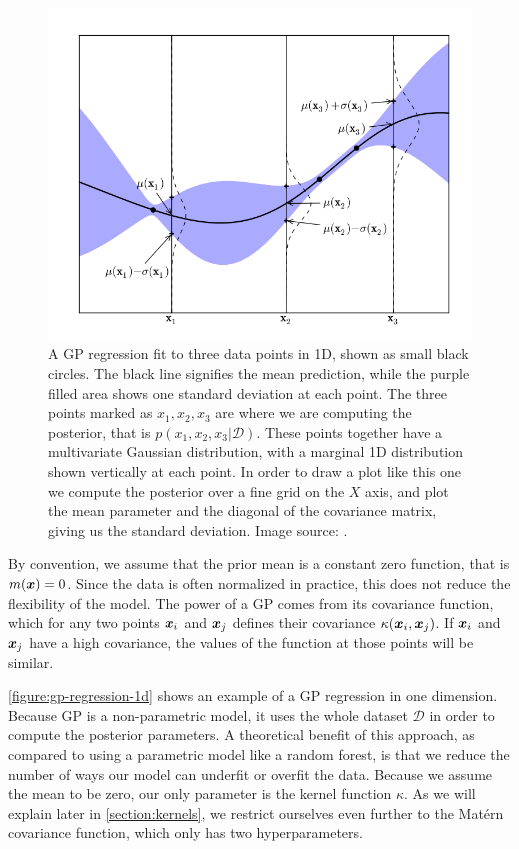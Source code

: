\begin{figure}
	\begin{center}
		\includegraphics[width=1.0\textwidth]{images/gp-1d.png}
		\caption{A GP regression fit to three data points in 1D, shown as small black circles. The black line signifies the mean prediction, while the purple filled area shows one standard deviation at each point. The three points marked as $x_1, x_2, x_3$ are where we are computing the posterior, that is $p(x_1, x_2, x_3 | \mathcal{D})$. These points together have a multivariate Gaussian distribution, with a marginal 1D distribution shown vertically at each point. In order to draw a plot like this one we compute the posterior over a fine grid on the $X$ axis, and plot the mean parameter and the diagonal of the covariance matrix, giving us the standard deviation. Image source: \cite{nando-bopt-tutorial}.}
		\label{figure:gp-regression-1d}
	\end{center}
\end{figure}

By convention, we assume that the prior mean is a constant zero function, that
is $m({\boldsymbol{x}}) = 0$. Since the data is often normalized in practice, this does not
reduce the flexibility of the model. The power of a GP comes from its
covariance function, which for any two points ${\boldsymbol{x}}_i$ and ${\boldsymbol{x}}_j$ defines their
covariance $\kappa({\boldsymbol{x}}_i, {\boldsymbol{x}}_j)$. If ${\boldsymbol{x}}_i$ and ${\boldsymbol{x}}_j$ have a high covariance,
the values of the function at those points will be similar.

\autoref{figure:gp-regression-1d} shows an example of a GP regression in one dimension. Because GP is a non-parametric model, it uses the whole dataset $\mathcal{D}$ in order to compute the posterior parameters. A theoretical benefit of this approach, as compared to using a parametric model like a random forest, is that we reduce the number of ways our model can underfit or overfit the data. Because we assume the mean to be zero, our only parameter is the kernel function $\kappa$. As we will explain later in \autoref{section:kernels}, we restrict ourselves even further to the Mat\'ern covariance function, which only has two hyperparameters.

